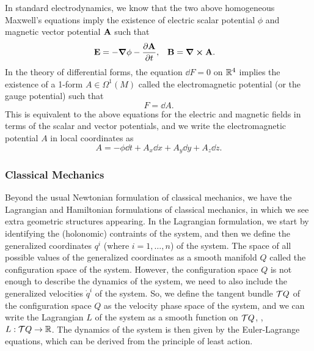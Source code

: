 In standard electrodynamics, we know that the two above homogeneous Maxwell's equations imply the existence of electric scalar potential \(\phi\) and magnetic vector potential \(\vb{A}\) such that
\begin{align*}
    \vb{E} & = -\grad{\phi} - \pdv{\vb{A}}{t}, & \vb{B} & = \curl{\vb{A}}.
\end{align*}
In the theory of differential forms, the equation \(\dd{F} = 0\) on \(\mathbb R^4\) implies the existence of a 1-form \(A \in \Omega^1(M)\) called the electromagnetic potential (or the gauge potential) such that
\begin{equation*}
    F = \dd{A}.
\end{equation*}
This is equivalent to the above equations for the electric and magnetic fields in terms of the scalar and vector potentials, and we write the electromagnetic potential \(A\) in local coordinates as
\begin{equation*}
    A = -\phi \dd{t} + A_x \dd{x} + A_y \dd{y} + A_z \dd{z}.
\end{equation*}

\subsubsection{Classical Mechanics}

Beyond the usual Newtonian formulation of classical mechanics, we have the Lagrangian and Hamiltonian formulations of classical mechanics, in which we see extra geometric structures appearing. In the Lagrangian formulation, we start by identifying the (holonomic) contraints of the system, and then we define the generalized coordinates \(q^i\) (where $i = 1, \ldots, n$) of the system. The space of all possible values of the generalized coordinates as a smooth manifold \(Q\) called the configuration space of the system. However, the configuration space \(Q\) is not enough to describe the dynamics of the system, we need to also include the generalized velocities \(\dot{q}^i\) of the system. So, we define the tangent bundle \(\mathcal T Q\) of the configuration space \(Q\) as the velocity phase space of the system, and we can write the Lagrangian \(L\) of the system as a smooth function on \(\mathcal T Q\), \ie, \(L: \mathcal T Q \to \mathbb R\). The dynamics of the system is then given by the Euler-Lagrange equations, which can be derived from the principle of least action.

